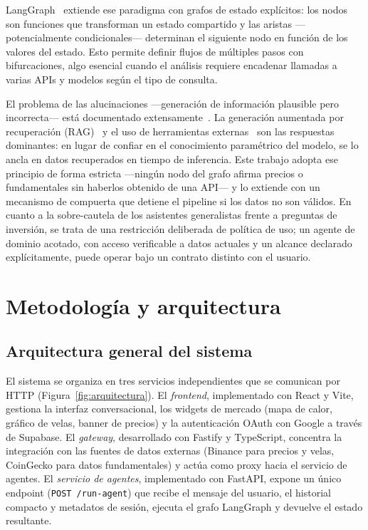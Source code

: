 \documentclass[runningheads]{llncs}
\begin{document}
LangGraph~\cite{langchain2024langgraph} extiende ese paradigma con grafos de estado
explícitos: los nodos son funciones que transforman un estado compartido y las aristas
—potencialmente condicionales— determinan el siguiente nodo en función de los valores del
estado. Esto permite definir flujos de múltiples pasos con bifurcaciones, algo esencial
cuando el análisis requiere encadenar llamadas a varias APIs y modelos según el tipo de
consulta.

El problema de las alucinaciones —generación de información plausible pero incorrecta—
está documentado extensamente~\cite{ji2023survey}. La generación aumentada por recuperación
(RAG)~\cite{lewis2020rag} y el uso de herramientas externas~\cite{schick2023toolformer} son
las respuestas dominantes: en lugar de confiar en el conocimiento paramétrico del modelo,
se lo ancla en datos recuperados en tiempo de inferencia. Este trabajo adopta ese principio
de forma estricta —ningún nodo del grafo afirma precios o fundamentales sin haberlos
obtenido de una API— y lo extiende con un mecanismo de compuerta que detiene el pipeline si
los datos no son válidos. En cuanto a la sobre-cautela de los asistentes generalistas
frente a preguntas de inversión, se trata de una restricción deliberada de política de uso;
un agente de dominio acotado, con acceso verificable a datos actuales y un alcance declarado
explícitamente, puede operar bajo un contrato distinto con el usuario.

\section{Metodología y arquitectura}

\subsection{Arquitectura general del sistema}

El sistema se organiza en tres servicios independientes que se comunican por HTTP
(Figura~\ref{fig:arquitectura}). El \emph{frontend}, implementado con React y Vite,
gestiona la interfaz conversacional, los widgets de mercado (mapa de calor, gráfico de
velas, banner de precios) y la autenticación OAuth con Google a través de Supabase. El
\emph{gateway}, desarrollado con Fastify y TypeScript, concentra la integración con las
fuentes de datos externas (Binance para precios y velas, CoinGecko para datos
fundamentales) y actúa como proxy hacia el servicio de agentes. El \emph{servicio de
agentes}, implementado con FastAPI, expone un único endpoint (\texttt{POST /run-agent})
que recibe el mensaje del usuario, el historial compacto y metadatos de sesión, ejecuta el
grafo LangGraph y devuelve el estado resultante.
\end{document}
